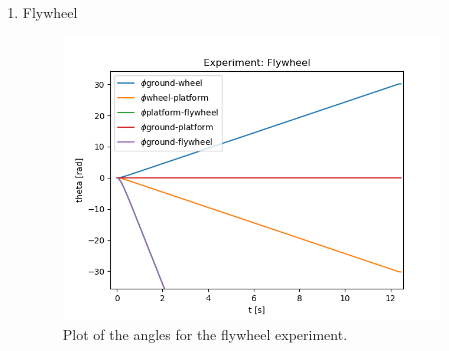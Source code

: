 \begin{enumerate}
	\item Flywheel
	      \begin{figure}[H]
		      \centering
		      \includegraphics[width=10cm]{img/lagrange_5/flywheel_q.png}
		      \caption{Plot of the angles for the flywheel experiment.}
		      \label{fig:Simulation flywheel q}
	      \end{figure}



\end{enumerate}
